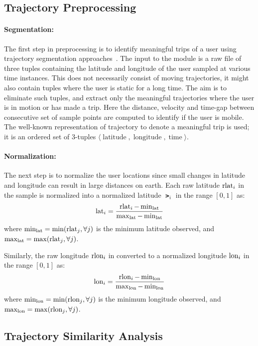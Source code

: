 \subsection{Trajectory Preprocessing} 

\paragraph{Segmentation:}
The first step in preprocessing is to identify meaningful trips of a user using trajectory segmentation approaches~\cite{Zheng2008}. The input to the module is a raw file of three tuples containing the latitude and longitude of the user sampled at various time instances. This does not necessarily consist of moving trajectories, it might also contain tuples where the user is static for a long time. The aim is to eliminate such tuples, and extract only the meaningful trajectories where the user is in motion or has made a trip. Here the distance, velocity and time-gap between consecutive set of sample points are computed to identify if the user is mobile. The well-known representation of trajectory to denote a meaningful trip is used; it is an ordered set of 3-tuples $\langle \operatorname{latitude},\operatorname{longitude},\operatorname{time} \rangle$.
\paragraph{Normalization:}
The next step is to normalize the user locations since small changes in latitude and longitude can result in large distances on earth. Each raw latitude $\operatorname{rlat}_i$ in the sample is normalized into a normalized latitude $\lat_i$ in the range $[0,1]$ as:
\begin{eqnarray}
\operatorname{lat}_i =\frac{\operatorname{rlat}_i - \min_{\operatorname{lat}}}{\max_{\operatorname{lat}} - \min_{\operatorname{lat}}}
\end{eqnarray}
where $\min_{\operatorname{lat}}=\min(\operatorname{rlat}_j, \forall j)$ is the minimum latitude observed, and $\max_{\operatorname{lat}}=\max(\operatorname{rlat}_j, \forall j)$. 

Similarly, the raw longitude $\operatorname{rlon}_i$ in converted to a normalized longitude $\operatorname{lon}_i$ in the range $[0,1]$ as:
\begin{eqnarray}
\operatorname{lon}_i =\frac{\operatorname{rlon}_i - \min_{\operatorname{lon}}}{\max_{\operatorname{lon}} - \min_{\operatorname{lon}}}
\end{eqnarray}
where $\min_{\operatorname{lon}}=\min(\operatorname{rlon}_j, \forall j)$ is the minimum longitude observed, and $\max_{\operatorname{lon}}=\max(\operatorname{rlon}_j, \forall j)$. 


\subsection{Trajectory Similarity Analysis}

